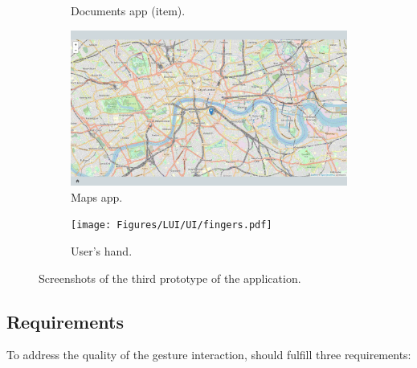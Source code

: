 \begin{figure}[ht]
\begin{subfigure}{.32\textwidth}
            \vspace{-5pt}
            \captionsetup{width=.9\linewidth}
            \caption{Documents app (item).}
            \label{fig:lui:screenshots:documents-fullscreen}
        \end{subfigure}
        \begin{subfigure}{.32\textwidth}
            \centering
            \includegraphics[width=.96\linewidth]{Figures/LUI/UI/maps.pdf} 
            \vspace{-5pt}
            \captionsetup{width=.9\linewidth}
            \caption{Maps app.}
            \label{fig:lui:screenshots:maps}
        \end{subfigure}
        \begin{subfigure}{.32\textwidth}
            \centering
            \texttt{[image: Figures/LUI/UI/fingers.pdf]} 
            \vspace{-5pt}
            \captionsetup{width=.9\linewidth}
            \caption{User's hand.}
            \label{fig:lui:screenshots:hand}
        \end{subfigure}
        
        \caption{Screenshots of the third prototype of the \lui application.}
        \label{fig:lui:screenshots}
    \end{figure}

\subsection{Requirements} \label{sec:lui:description:requirements}
To address the quality of the gesture interaction, \lui should fulfill three requirements:


